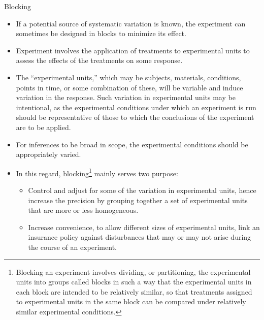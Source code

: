 \documentclass[
  ignorenonframetext,
  aspectratio=169]{beamer}
\providecommand{\tightlist}{%
  \setlength{\itemsep}{0pt}\setlength{\parskip}{0pt}}
\begin{document}
\begin{frame}{Blocking}
\protect\hypertarget{blocking}{}
\footnotesize

\begin{itemize}[<+->]
\tightlist
\item
  If a potential source of systematic variation is known, the experiment
  can sometimes be designed in blocks to minimize its effect.
\item
  Experiment involves the application of treatments to experimental
  units to assess the effects of the treatments on some response.
\item
  The ``\alert{experimental units},'' which may be subjects, materials,
  conditions, points in time, or some combination of these, will be
  variable and induce variation in the response. Such variation in
  experimental units may be intentional, as the experimental conditions
  under which an experiment is run should be representative of those to
  which the conclusions of the experiment are to be applied.
\item
  For inferences to be broad in scope, the experimental conditions
  should be appropriately varied.
\item
  In this regard,
  blocking\footnote[frame]{Blocking an experiment involves dividing, or partitioning, the experimental units into groups called blocks in such a way that the experimental units in each block are intended to be relatively similar, so that treatments assigned to experimental units in the same block can be compared under relatively similar experimental conditions.}
  mainly serves two purpose:

  \begin{itemize}
  \scriptsize
  \item Control and adjust for some of the variation in experimental units, hence increase the precision by grouping together a set of experimental units that are more or less homogeneous.
  \item Increase convenience, to allow different sizes of experimental units, link an insurance policy against disturbances that may or may not arise during the course of an experiment.
  \end{itemize}
\end{itemize}
\end{frame}
\end{document}

